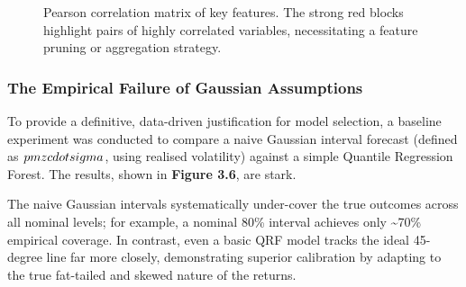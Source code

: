 \documentclass[
  a4paper,
  DIV=11,
  numbers=noendperiod]{scrreprt}
\begin{document}
\begin{figure}


\caption{\label{fig-leverage-effect}Pearson correlation matrix of key
features. The strong red blocks highlight pairs of highly correlated
variables, necessitating a feature pruning or aggregation strategy.}

\end{figure}%

\subsubsection{The Empirical Failure of Gaussian
Assumptions}\label{the-empirical-failure-of-gaussian-assumptions}

To provide a definitive, data-driven justification for model selection,
a baseline experiment was conducted to compare a naive Gaussian interval
forecast (defined as \(\\pm z \\cdot \\sigma\), using realised
volatility) against a simple Quantile Regression Forest. The results,
shown in \textbf{Figure 3.6}, are stark.

The naive Gaussian intervals systematically under-cover the true
outcomes across all nominal levels; for example, a nominal 80\% interval
achieves only \textasciitilde70\% empirical coverage. In contrast, even
a basic QRF model tracks the ideal 45-degree line far more closely,
demonstrating superior calibration by adapting to the true fat-tailed
and skewed nature of the returns.
\end{document}
